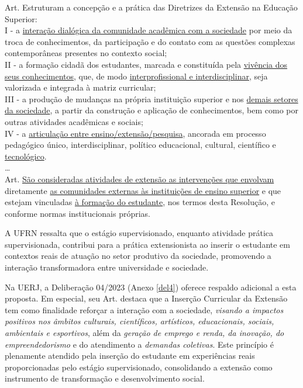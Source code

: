 \begin{itquotation}
    \noindent%
    Art.  Estruturam a concepção e a prática das Diretrizes da Extensão na Educação
    Superior:\\
    I - a \underline{interação dialógica da comunidade acadêmica com a sociedade} por meio da
    troca de conhecimentos, da participação e do contato com as questões complexas
    contemporâneas presentes no contexto social;\\
    II - a formação cidadã dos estudantes, marcada e constituída pela \underline{vivência dos} \underline{seus
        conhecimentos}, que, de modo \underline{interprofissional e interdisciplinar}, seja
    valorizada e integrada à matriz curricular;\\
    III - a produção de mudanças na própria instituição superior e nos \underline{demais setores} \underline{da
        sociedade}, a partir da construção e aplicação de conhecimentos, bem como por outras
    atividades acadêmicas e sociais;\\
    IV - a \underline{articulação entre ensino/extensão/pesquisa}, ancorada em processo pedagógico
    único, interdisciplinar, político educacional, cultural, científico e \underline{tecnológico}.\\
    \ldots\\
    Art.  \underline{São consideradas atividades de extensão as intervenções que envolvam} diretamente \underline{as comunidades externas às instituições de ensino superior} e que estejam vinculadas \underline{à formação do estudante},
    nos termos desta Resolução, e conforme normas institucionais próprias.
\end{itquotation}

A UFRN ressalta que o estágio supervisionado, enquanto atividade prática supervisionada, contribui para a prática extensionista ao inserir o estudante em contextos reais de atuação no setor produtivo da sociedade, promovendo a interação transformadora entre universidade e sociedade.

Na UERJ, a Deliberação  04/2023 (Anexo \ref{del4}) oferece respaldo adicional a esta proposta. Em especial, seu Art.  destaca que a Inserção Curricular da Extensão tem como finalidade reforçar a interação com a sociedade, \textit{visando a impactos positivos nos âmbitos culturais, científicos, artísticos, educacionais, sociais, ambientais e esportivos}, além da \textit{geração de emprego e renda, da inovação, do empreendedorismo} e do atendimento a \textit{demandas coletivas}. Este princípio é plenamente atendido pela inserção do estudante em experiências reais proporcionadas pelo estágio supervisionado, consolidando a extensão como instrumento de transformação e desenvolvimento social.

